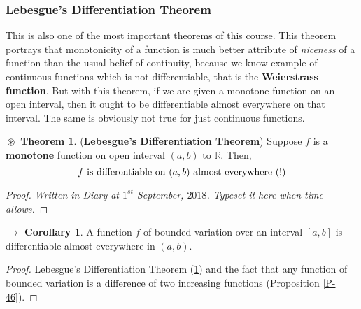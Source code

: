 \documentclass{article}
\theoremstyle{definition}
\newtheorem{theorem}{$\boxed{\boxed{\circledast}}$ Theorem}
\theoremstyle{remark}
\theoremstyle{definition}
\newtheorem{corollary}{$ \to $ Corollary}
\theoremstyle{definition}
\theoremstyle{definition}
\newcommand{\R}{\mathbb{R}}
\begin{document}
\subsubsection{Lebesgue's Differentiation Theorem}
This is also one of the most important theorems of this course. This theorem portrays that monotonicity of a function is much better attribute of \emph{niceness} of a function than the usual belief of continuity, because we know example of continuous functions which is not differentiable, that is the \textbf{Weierstrass function}. But with this theorem, if we are given a monotone function on an open interval, then it ought to be differentiable almost everywhere on that interval. The same is obviously not true for just continuous functions.
\begin{theorem}\label{T-15}
	(\textbf{Lebesgue's Differentiation Theorem}) Suppose $ f $ is a \textbf{monotone} function on open interval $ (a,b) $ to $ \R $. Then, 
	\[f \text{ is differentiable on $ (a,b) $ almost everywhere (!)}\]
\end{theorem}
\begin{proof}
	\emph{Written in Diary at $ 1^{st} $ September, $ 2018 $. Typeset it here when time allows.}
\end{proof}
\begin{corollary}\label{C-2}
	A function $ f $ of bounded variation over an interval $ [a,b] $ is differentiable almost everywhere in $ (a,b) $.
\end{corollary}
\begin{proof}
	Lebesgue's Differentiation Theorem (\ref{T-15}) and the fact that any function of bounded variation is a difference of two increasing functions (Proposition \ref{P-46}). 
\end{proof}
\hrulefill
\newpage
\end{document}
